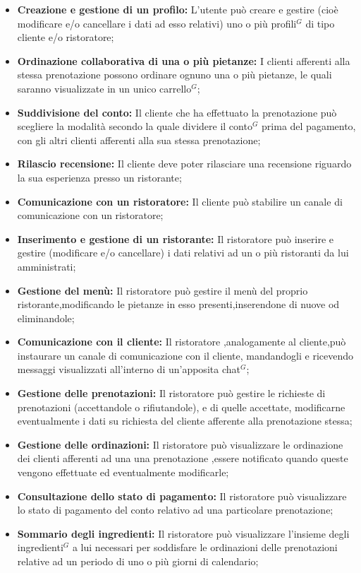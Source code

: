\begin{itemize}
    \item \textbf{Creazione e gestione di un profilo:} L'utente può creare e gestire (cioè modificare e/o
    cancellare i dati ad esso relativi) uno o più profili$^{G}$ di tipo cliente e/o ristoratore;
    \item \textbf{Ordinazione collaborativa di una o più pietanze:} I clienti afferenti alla stessa prenotazione
    possono ordinare ognuno una o più pietanze, le quali saranno visualizzate in un unico carrello$^{G}$;
    \item \textbf{Suddivisione del conto:} Il cliente che ha effettuato la prenotazione può scegliere la modalità secondo la quale
    dividere il conto$^{G}$ prima del pagamento, con gli altri clienti afferenti alla sua stessa prenotazione;
    \item \textbf{Rilascio recensione:} Il cliente deve poter rilasciare una recensione riguardo la sua
    esperienza presso un ristorante;
    \item \textbf{Comunicazione con un ristoratore:} Il cliente può stabilire un canale di comunicazione con un
    ristoratore;
    \item \textbf{Inserimento e gestione di un ristorante:} Il ristoratore può inserire e gestire (modificare e/o cancellare)
    i dati relativi ad un o più ristoranti da lui amministrati;
    \item \textbf{Gestione del menù:} Il ristoratore può gestire il menù del proprio ristorante,modificando le pietanze in esso
    presenti,inserendone di nuove od eliminandole;
    \item \textbf{Comunicazione con il cliente:} Il ristoratore ,analogamente al cliente,può instaurare un canale di comunicazione
    con il cliente, mandandogli e ricevendo messaggi visualizzati all'interno di un'apposita chat$^{G}$;
    \item \textbf{Gestione delle prenotazioni:} Il ristoratore può gestire le richieste di prenotazioni (accettandole o rifiutandole), e
    di quelle accettate, modificarne eventualmente i dati su richiesta del cliente afferente alla prenotazione stessa;
    \item \textbf{Gestione delle ordinazioni:} Il ristoratore può visualizzare le ordinazione dei clienti afferenti ad una
    una prenotazione ,essere notificato quando queste vengono effettuate ed eventualmente modificarle;
    \item \textbf{Consultazione dello stato di pagamento:} Il ristoratore può visualizzare lo stato di pagamento del conto relativo ad una
    particolare prenotazione;
    \item \textbf{Sommario degli ingredienti:} Il ristoratore può visualizzare l'insieme degli ingredienti$^{G}$ a lui necessari per soddisfare
    le ordinazioni delle prenotazioni  relative ad un periodo di uno o più giorni di calendario;
\end{itemize}
